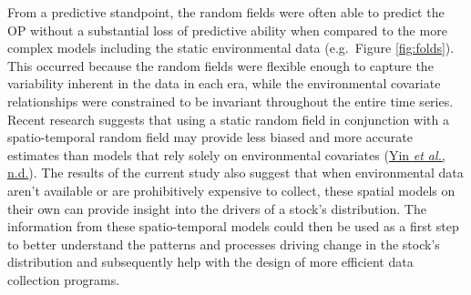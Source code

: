 \documentclass[
]{article}
\begin{document}
From a predictive standpoint, the random fields were often able to predict the OP without a substantial loss of predictive ability when compared to the more complex models including the static environmental data (e.g.~Figure \ref{fig:folds}). This occurred because the random fields were flexible enough to capture the variability inherent in the data in each era, while the environmental covariate relationships were constrained to be invariant throughout the entire time series. Recent research suggests that using a static random field in conjunction with a spatio-temporal random field may provide less biased and more accurate estimates than models that rely solely on environmental covariates (\protect\hyperlink{ref-yinReviewSpatiotemporalModel}{Yin \emph{et al.}, n.d.}). The results of the current study also suggest that when environmental data aren't available or are prohibitively expensive to collect, these spatial models on their own can provide insight into the drivers of a stock's distribution. The information from these spatio-temporal models could then be used as a first step to better understand the patterns and processes driving change in the stock's distribution and subsequently help with the design of more efficient data collection programs.
\end{document}
